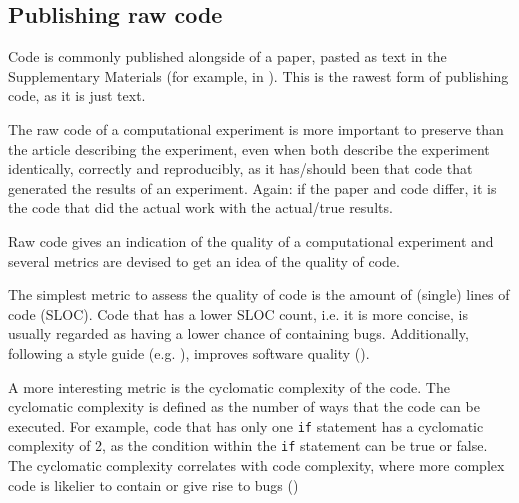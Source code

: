 \subsection{Publishing raw code}

Code is commonly published alongside of a 
paper, pasted as text in the Supplementary Materials 
(for example, in \cite{labrecque2019interpretation}).
This is the rawest form of publishing code,
as it is just text.


The raw code of a computational experiment is
more important to preserve than the article describing
the experiment, even when both describe the experiment identically,
correctly and reproducibly, 
as it has/should been that code that generated the results of an experiment.
Again: if the paper and code differ, it is the code that did
the actual work with the actual/true results.


Raw code gives an indication of the quality 
of a computational experiment and several metrics are
devised to get an idea of the quality of code.

The simplest metric to assess the quality of code is 
the amount of (single) lines of code (SLOC). 
Code that has a lower SLOC count, i.e. it is more concise,
is usually regarded as having a lower chance of containing bugs.
Additionally, following a style guide (e.g. \cite{style_guide}), 
improves software quality (\cite{fang2001}).

A more interesting metric is the cyclomatic complexity of the code.
The cyclomatic complexity is defined as the number of ways that
the code can be executed. 
For example, code that has only one \verb|if| statement
has a cyclomatic complexity of 2, as the condition within the \verb|if|
statement can be true or false.
The cyclomatic complexity correlates with code complexity,
where more complex code is likelier to contain or give rise to bugs 
(\cite{abd2018calculating,chen2019empirical,zimmermann2008predicting})

